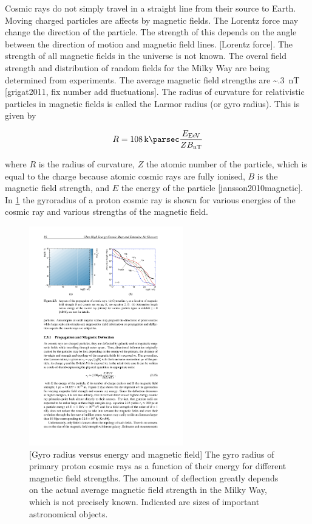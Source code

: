 Cosmic rays do not simply travel in a straight line from their source to Earth. Moving charged particles are affects by magnetic fields. The Lorentz force may change the direction of the particle. The strength of this depends on the angle between the direction of motion and magnetic field lines. [Lorentz force].
The strength of all magnetic fields in the universe is not known. The overal field strength and distribution of random fields for the Milky Way are being determined from experiments. The average magnetic field strengths are \SI{~.3}{\nano\tesla} [grigat2011, fix number add fluctuations]. The radius of curvature for relativistic particles in magnetic fields is called the Larmor radius (or gyro radius). This is given by

\begin{equation}
    R = \SI{108}{\kilo\parsec}
        \frac{E_{\si{\exa\eV}}}{Z B_{\si{\nano\tesla}}}
\end{equation}

where $R$ is the radius of curvature, $Z$ the atomic number of the particle, which is equal to the charge because atomic cosmic rays are fully ionised, $B$ is the magnetic field strength, and $E$ the energy of the particle [jansson2010magnetic]. In \cref{fig:gyroradius} the gyroradius of a proton cosmic ray is shown for various energies of the cosmic ray and various strengths of the magnetic field.

\begin{figure}
    \centering
    \includegraphics[width=0.6\textwidth]
                    {plots/cosmic-rays/gyroradius}
    \caption{[Gyro radius versus energy and magnetic field]
The gyro radius of primary proton cosmic rays as a function of their energy for different magnetic field strengths. The amount of deflection greatly depends on the actual average magnetic field strength in the Milky Way, which is not precisely known. Indicated are sizes of important astronomical objects.}
    \label{fig:gyroradius}
\end{figure}

